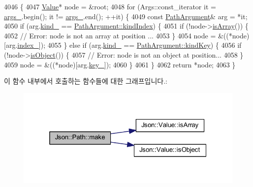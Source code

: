 \begin{DoxyCode}
4046                                    \{
4047   \hyperlink{class_json_1_1_value}{Value}* node = &root;
4048   \textcolor{keywordflow}{for} (Args::const\_iterator it = \hyperlink{class_json_1_1_path_af33d0de7ee9f99d3e361bdf504dc2bc7}{args\_}.begin(); it != \hyperlink{class_json_1_1_path_af33d0de7ee9f99d3e361bdf504dc2bc7}{args\_}.end(); ++it) \{
4049     \textcolor{keyword}{const} \hyperlink{class_json_1_1_path_argument}{PathArgument}& arg = *it;
4050     \textcolor{keywordflow}{if} (arg.\hyperlink{class_json_1_1_path_argument_ad4bc4b544b155a3d9c7788572ecf991b}{kind\_} == \hyperlink{class_json_1_1_path_argument_a2420bbad778573c147e578701b84d9b9ae5a976b898111903334cb131f5e03dc4}{PathArgument::kindIndex}) \{
4051       \textcolor{keywordflow}{if} (!node->\hyperlink{class_json_1_1_value_a1627eb9d6568d6d0252fa8bb711c0a59}{isArray}()) \{
4052         \textcolor{comment}{// Error: node is not an array at position ...}
4053       \}
4054       node = &((*node)[arg.\hyperlink{class_json_1_1_path_argument_afd5857d1b6bfaae6961333bdae7bd5ec}{index\_}]);
4055     \} \textcolor{keywordflow}{else} \textcolor{keywordflow}{if} (arg.\hyperlink{class_json_1_1_path_argument_ad4bc4b544b155a3d9c7788572ecf991b}{kind\_} == \hyperlink{class_json_1_1_path_argument_a2420bbad778573c147e578701b84d9b9a74f5968d06c01701b7a46092c33ba7d1}{PathArgument::kindKey}) \{
4056       \textcolor{keywordflow}{if} (!node->\hyperlink{class_json_1_1_value_a8cf96c0f2a552051fcfc78ffee60e037}{isObject}()) \{
4057         \textcolor{comment}{// Error: node is not an object at position...}
4058       \}
4059       node = &((*node)[arg.\hyperlink{class_json_1_1_path_argument_af4024368548ff730ef2bed97d6f1ca43}{key\_}]);
4060     \}
4061   \}
4062   \textcolor{keywordflow}{return} *node;
4063 \}
\end{DoxyCode}
이 함수 내부에서 호출하는 함수들에 대한 그래프입니다.\+:\nopagebreak
\begin{figure}[H]
\begin{center}
\leavevmode
\includegraphics[width=319pt]{class_json_1_1_path_a858f9426f0f7bbe0450644d72b44e26b_cgraph}
\end{center}
\end{figure}
\mbox{\label{class_json_1_1_path_a362a420a47acb1a1f9c79173cbfef94d}} 
